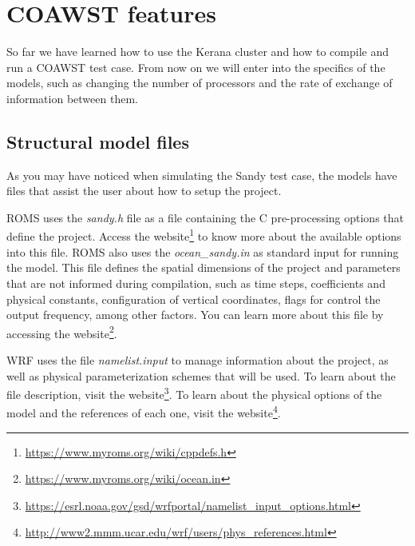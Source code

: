 \chapter{COAWST features}
\bigskip
\noindent So far we have learned how to use the Kerana cluster and how to compile and run a COAWST test case.
From now on we will enter into the specifics of the models, such as changing the number of processors
and the rate of exchange of information between them.
\bigskip

\section{Structural model files}
\bigskip

\noindent As you may have noticed when simulating the Sandy test case, the models have files that assist the user about how to setup the project.

\bigskip

\noindent ROMS uses the \textit{sandy.h} file as a file containing the C pre-processing options that define the project.
Access the website\textcolor{bleu_cite}{\textit{}\footnote{\textcolor{bleu_cite}{\href{https://www.myroms.org/wiki/cppdefs.h}{https://www.myroms.org/wiki/cppdefs.h}}}}
to know more about the available options into this file. ROMS also uses the \textit{ocean\_sandy.in} as standard input for
running the model. This file defines the spatial dimensions of the project and parameters that are not informed during compilation,
such as time steps, coefficients and physical constants, configuration of vertical coordinates, flags for
control the output frequency, among other factors. You can learn more about this file by accessing the
website\textcolor{bleu_cite}{\textit{}\footnote{\textcolor{bleu_cite}{\href{https://www.myroms.org/wiki/ocean.in}{https://www.myroms.org/wiki/ocean.in}}}}.
\bigskip

\noindent WRF uses the file \textit{namelist.input} to manage information about the project, as well as
physical parameterization schemes that will be used. To learn about the file description,
visit the website\textcolor{bleu_cite}{\textit{}\footnote{\textcolor{bleu_cite}{\href{https://esrl.noaa.gov/gsd/wrfportal/namelist\_input\_options.html}{https://esrl.noaa.gov/gsd/wrfportal/namelist\_input\_options.html}}}}.
To learn about the physical options of the model and the references of each one, visit the
website\textcolor{bleu_cite}{\textit{}\footnote{\textcolor{bleu_cite}{\href{http://www2.mmm.ucar.edu/wrf/users/phys\_references.html}{http://www2.mmm.ucar.edu/wrf/users/phys\_references.html}}}}.
\bigskip

